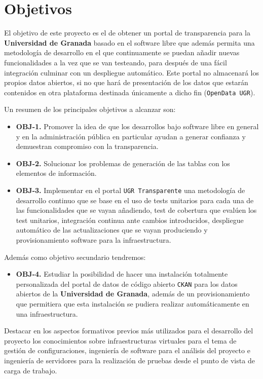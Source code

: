 \chapter{Objetivos}

El objetivo de este proyecto es el de obtener un portal de transparencia para la \textbf{Universidad de Granada} basado en el software libre que además permita una metodología de desarrollo en el que continuamente se puedan añadir nuevas funcionalidades a la vez que se van testeando, para después de una fácil integración culminar con un despliegue automático. Este portal no almacenará los propios datos abiertos, si no que hará de presentación de los datos que estarán contenidos en otra plataforma destinada únicamente a dicho fin ({\tt OpenData UGR}).

\bigskip
Un resumen de los principales objetivos a alcanzar son:

\begin{itemize}
  \item \textbf{OBJ-1.} Promover la idea de que los desarrollos bajo software libre en general y en la administración pública en particular ayudan a generar confianza y demuestran compromiso con la transparencia.
  \item \textbf{OBJ-2.} Solucionar los problemas de generación de las tablas con los elementos de información.
  \item \textbf{OBJ-3.} Implementar en el portal {\tt UGR Transparente} una metodología de desarrollo continuo que se base en el uso de tests unitarios para cada una de las funcionalidades que se vayan añadiendo, test de cobertura que evalúen los test unitarios, integración continua ante cambios introducidos, despliegue automático de las actualizaciones que se vayan produciendo y provisionamiento software para la infraestructura.
\end{itemize}

Además como objetivo secundario tendremos:

\begin{itemize}
  \item \textbf{OBJ-4.} Estudiar la posibilidad de hacer una instalación totalmente personalizada del portal de datos de código abierto {\tt CKAN} para los datos abiertos de la \textbf{Universidad de Granada}, además de un provisionamiento que permitiera que esta instalación se pudiera realizar automáticamente en una infraestructura.
\end{itemize}

\bigskip
Destacar en los aspectos formativos previos más utilizados para el desarrollo del proyecto los conocimientos sobre infraestructuras virtuales para el tema de gestión de configuraciones, ingeniería de software para el análisis del proyecto e ingeniería de servidores para la realización de pruebas desde el punto de vista de carga de trabajo.

